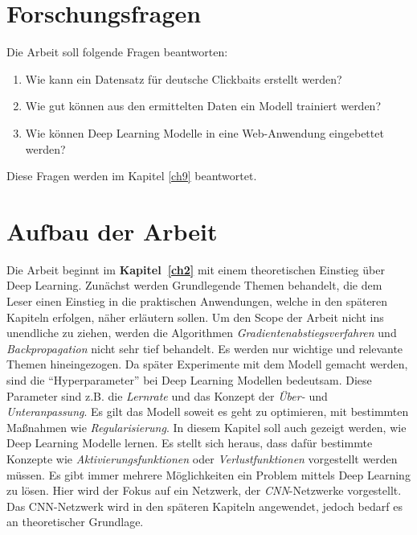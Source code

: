 \section{Forschungsfragen}
Die Arbeit soll folgende Fragen beantworten:
\begin{enumerate}
    \item Wie kann ein Datensatz für deutsche Clickbaits erstellt werden?
    \item Wie gut können aus den ermittelten Daten ein Modell trainiert werden?
    \item Wie können Deep Learning Modelle in eine Web-Anwendung eingebettet werden?
\end{enumerate}
Diese Fragen werden im Kapitel \ref{ch9} beantwortet.

\section{Aufbau der Arbeit}

Die Arbeit beginnt im \textbf{Kapitel~\ref{ch2}} mit einem theoretischen Einstieg über Deep Learning. Zunächst werden Grundlegende Themen behandelt, die dem Leser einen Einstieg in die praktischen Anwendungen, welche in den späteren Kapiteln erfolgen, näher erläutern sollen. Um den Scope der Arbeit nicht ins unendliche zu ziehen, werden die Algorithmen \textit{Gradientenabstiegsverfahren} und \textit{Backpropagation} nicht sehr tief behandelt. Es werden nur wichtige und relevante Themen hineingezogen. Da später Experimente mit dem Modell gemacht werden, sind die \enquote{Hyperparameter} bei Deep Learning Modellen bedeutsam. Diese Parameter sind z.B. die \textit{Lernrate} und das Konzept der \textit{Über-} und \textit{Unteranpassung}. Es gilt das Modell soweit es geht zu optimieren, mit bestimmten Maßnahmen wie \textit{Regularisierung}. In diesem Kapitel soll auch gezeigt werden, wie Deep Learning Modelle lernen. Es stellt sich heraus, dass dafür bestimmte Konzepte wie \textit{Aktivierungsfunktionen} oder \textit{Verlustfunktionen} vorgestellt werden müssen. Es gibt immer mehrere Möglichkeiten ein Problem mittels Deep Learning zu lösen. Hier wird der Fokus auf ein Netzwerk, der \textit{CNN}-Netzwerke vorgestellt. Das CNN-Netzwerk wird in den späteren Kapiteln angewendet, jedoch bedarf es an theoretischer Grundlage.



